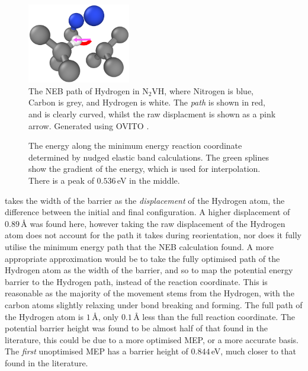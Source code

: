 \documentclass[10pt,a4paper,twocolumn,twoside]{extarticle}
\newcommand{\ntvh}{N$_2$VH}
\begin{document}
\begin{figure}
	\includegraphics[width=0.4\textwidth]{n2vh_2.png}
	\caption{The NEB path of Hydrogen in \ntvh, where Nitrogen is blue, Carbon is grey, and Hydrogen is white. The \emph{path} is shown in red, and is clearly curved, whilst the raw displacment is shown as a pink arrow. Generated using OVITO \cite{OVITO}.}
	\label{fig:n2vh}
\end{figure}


\begin{figure}
		\resizebox{\columnwidth}{!}{%
		
		}
		\caption{The energy along the minimum energy reaction coordinate determined by nudged elastic band calculations. The green splines show the gradient of the energy, which is used for interpolation. There is a peak of $0.536$\,eV in the middle.}
		\label{fig:n2vh_energy}
\end{figure}



\textcite{Peaker} takes the width of the barrier as the \emph{displacement} of the Hydrogen atom, the difference between the initial and final configuration. A higher displacement of $0.89$\,{\AA} was found here, however taking the raw displacement of the Hydrogen atom does not account for the path it takes during reorientation, nor does it fully utilise the minimum energy path that the NEB calculation found. A more appropriate approximation would be to take the fully optimised path of the Hydrogen atom as the width of the barrier, and so to map the potential energy barrier to the Hydrogen path, instead of the reaction coordinate. This is reasonable as the majority of the movement stems from the Hydrogen, with the carbon atoms slightly relaxing under bond breaking and forming. The full path of the Hydrogen atom is $1$\,{\AA}, only $0.1$\,{\AA} less than the full reaction coordinate. The potential barrier height was found to be almost half of that found in the literature, this could be due to a more optimised MEP, or a more accurate basis. The \emph{first} unoptimised MEP has a barrier height of $0.844$\,eV, much closer to that found in the literature. 
\end{document}
